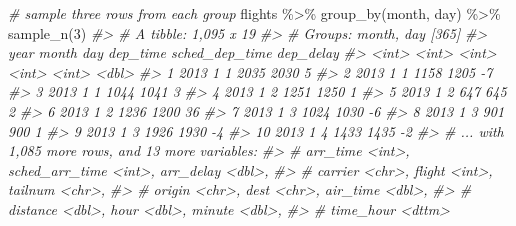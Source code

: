 \documentclass[
]{book}
\newenvironment{Shaded}{\begin{snugshade}}{\end{snugshade}}
\newcommand{\CommentTok}[1]{\textcolor[rgb]{0.56,0.35,0.01}{\textit{#1}}}
\newcommand{\DecValTok}[1]{\textcolor[rgb]{0.00,0.00,0.81}{#1}}
\newcommand{\FunctionTok}[1]{\textcolor[rgb]{0.00,0.00,0.00}{#1}}
\newcommand{\NormalTok}[1]{#1}
\newcommand{\SpecialCharTok}[1]{\textcolor[rgb]{0.00,0.00,0.00}{#1}}
\begin{document}
\begin{Shaded}
\begin{Highlighting}[]
\CommentTok{\# sample three rows from each group}
\NormalTok{flights }\SpecialCharTok{\%\textgreater{}\%} \FunctionTok{group\_by}\NormalTok{(month, day) }\SpecialCharTok{\%\textgreater{}\%} \FunctionTok{sample\_n}\NormalTok{(}\DecValTok{3}\NormalTok{)}
\CommentTok{\#\textgreater{} \# A tibble: 1,095 x 19}
\CommentTok{\#\textgreater{} \# Groups:   month, day [365]}
\CommentTok{\#\textgreater{}     year month   day dep\_time sched\_dep\_time dep\_delay}
\CommentTok{\#\textgreater{}    \textless{}int\textgreater{} \textless{}int\textgreater{} \textless{}int\textgreater{}    \textless{}int\textgreater{}          \textless{}int\textgreater{}     \textless{}dbl\textgreater{}}
\CommentTok{\#\textgreater{}  1  2013     1     1     2035           2030         5}
\CommentTok{\#\textgreater{}  2  2013     1     1     1158           1205        {-}7}
\CommentTok{\#\textgreater{}  3  2013     1     1     1044           1041         3}
\CommentTok{\#\textgreater{}  4  2013     1     2     1251           1250         1}
\CommentTok{\#\textgreater{}  5  2013     1     2      647            645         2}
\CommentTok{\#\textgreater{}  6  2013     1     2     1236           1200        36}
\CommentTok{\#\textgreater{}  7  2013     1     3     1024           1030        {-}6}
\CommentTok{\#\textgreater{}  8  2013     1     3      901            900         1}
\CommentTok{\#\textgreater{}  9  2013     1     3     1926           1930        {-}4}
\CommentTok{\#\textgreater{} 10  2013     1     4     1433           1435        {-}2}
\CommentTok{\#\textgreater{} \# ... with 1,085 more rows, and 13 more variables:}
\CommentTok{\#\textgreater{} \#   arr\_time \textless{}int\textgreater{}, sched\_arr\_time \textless{}int\textgreater{}, arr\_delay \textless{}dbl\textgreater{},}
\CommentTok{\#\textgreater{} \#   carrier \textless{}chr\textgreater{}, flight \textless{}int\textgreater{}, tailnum \textless{}chr\textgreater{},}
\CommentTok{\#\textgreater{} \#   origin \textless{}chr\textgreater{}, dest \textless{}chr\textgreater{}, air\_time \textless{}dbl\textgreater{},}
\CommentTok{\#\textgreater{} \#   distance \textless{}dbl\textgreater{}, hour \textless{}dbl\textgreater{}, minute \textless{}dbl\textgreater{},}
\CommentTok{\#\textgreater{} \#   time\_hour \textless{}dttm\textgreater{}}


\end{Highlighting}
\end{Shaded}
\end{document}
